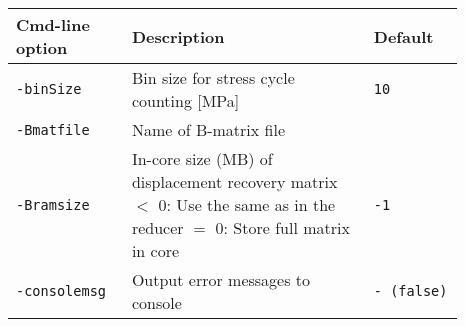 \noindent
\begin{threeparttable}[b]
\footnotesize
\begin{tabular}{|>{\raggedright} p{0.23\linewidth}| p{0.48\linewidth}| p{0.18\linewidth}|}
  \hline
  \rowcolor[HTML]{EFEFEF}
  \rule{0pt}{15pt}Cmd-line option & Description & Default  \\
  \hline\hline
  \texttt{-binSize} &    Bin size for stress cycle counting [MPa] & \texttt{10}   \\
  \hline
  \texttt{-Bmatfile} &   Name of B-matrix file &   \\
  \hline
  \texttt{-Bramsize} &   In-core size (MB) of displacement recovery matrix\newline
                         $<$ 0: Use the same as in the reducer\newline
                         $=$ 0: Store full matrix in core  & \texttt{-1}   \\
  \hline
  \texttt{-consolemsg} &   Output error messages to console   & \texttt{- (false)}   \\
  \hline


\end{tabular}
\end{threeparttable}

